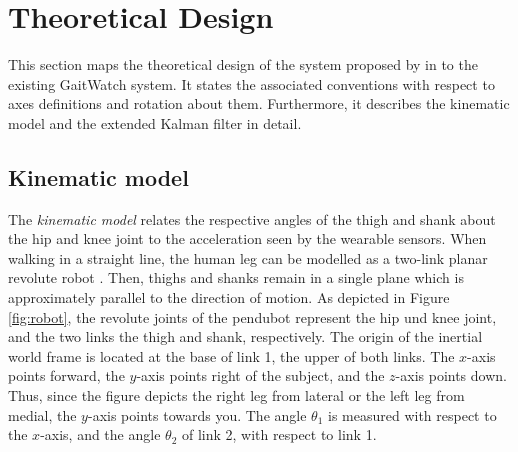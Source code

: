 \section{Theoretical Design}\label{sec:theoretical_design}

This section maps the theoretical design of the system proposed by \citeauthor{bennett_motion_2014} in \cite{bennett_motion_2014} to the existing GaitWatch system. It states the associated conventions with respect to axes definitions and rotation about them. Furthermore, it describes the kinematic model and the extended Kalman filter in detail.

\subsection{Kinematic model}

The \emph{kinematic model} relates the respective angles of the thigh and shank about the hip and knee joint to the acceleration seen by the wearable sensors. When walking in a straight line, the human leg can be modelled as a two-link planar revolute robot \cite{bennett_motion_2014}. Then, thighs and shanks remain in a single plane which is approximately parallel to the direction of motion. As depicted in Figure \ref{fig:robot}, the revolute joints of the \gls{pendubot} represent the hip und knee joint, and the two links the thigh and shank, respectively. The origin of the inertial world frame is located at the base of link 1, the upper of both links. The $x$-axis points forward, the $y$-axis points right of the subject, and the $z$-axis points down. Thus, since the figure depicts the right leg from lateral or the left leg from medial, the $y$-axis points towards you. The angle $\theta_1$ is measured with respect to the $x$-axis, and the angle $\theta_2$ of link 2, with respect to link 1. 

